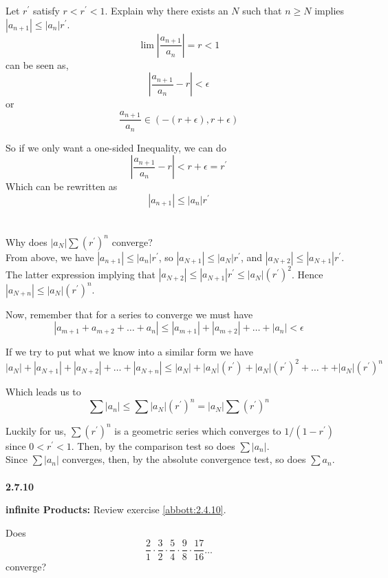Let $r^{\prime}$ satisfy $r < r^{\prime} < 1$.
Explain why there exists an $N$ such that $n\geq N$
implies $|a_{n+1}| \leq |a_n|r^{\prime}$.
\\

$$
\lim \left| \frac{a_{n+1}}{a_n} \right| = r < 1
$$
can be seen as,
$$
\left| \frac{a_{n+1}}{a_n} - r \right| < \epsilon
$$
or
$$
\frac{a_{n+1}}{a_n} \in (-(r+\epsilon), r+\epsilon)
$$

So if we only want a one-sided Inequality, we can do
$$
\left| \frac{a_{n+1}}{a_n} - r \right| < r+\epsilon = r^{\prime}
$$
Which can be rewritten as
$$
| a_{n+1} | \leq | a_n | r^{\prime}
$$
\\~\\

Why does $|a_N| \sum (r^{\prime})^n$ converge?
\\

From above, we have $| a_{n+1} | \leq | a_n | r^{\prime}$,
so $|a_{N+1}| \leq |a_N|r^{\prime}$, and $|a_{N+2}| \leq |a_{N+1}|r^{\prime}$.
The latter expression implying that $|a_{N+2}| \leq |a_{N+1}|r^{\prime} \leq |a_N|(r^{\prime})^2$.
Hence $|a_{N+n}| \leq |a_N| (r^{\prime})^n$.

Now, remember that for a series to converge we must have
$$
|a_{m+1} + a_{m+2} + \ldots + a_n| \leq |a_{m+1}| + |a_{m+2}| + \ldots + |a_n| < \epsilon
$$

If we try to put what we know into a similar form we have
$$
|a_N| + |a_{N+1}| + |a_{N+2}| + \ldots + |a_{N+n}| \leq
|a_N| + |a_N|(r^{\prime}) + |a_N|(r^{\prime})^2 + \ldots + + |a_N|(r^{\prime})^n 
$$

Which leads us to
$$
\sum |a_n| \leq \sum |a_N| (r^{\prime})^n = |a_N| \sum (r^{\prime})^n
$$

Luckily for us, $\sum (r^{\prime})^n$ is a geometric series which converges to $1/(1- r^\prime)$
since $0 < r^\prime < 1$.
Then, by the comparison test so does $\sum |a_n|$.
\\

Since $\sum |a_n|$ converges, then, by the absolute convergence test, so does $\sum a_n$.
\\~\\



\textbf{2.7.10}

\textbf{infinite Products:} Review exercise \ref{abbott:2.4.10}.

Does
$$
\frac{2}{1}\cdot \frac{3}{2}\cdot \frac{5}{4}\cdot \frac{9}{8}\cdot \frac{17}{16} \ldots
$$
converge?
\\

